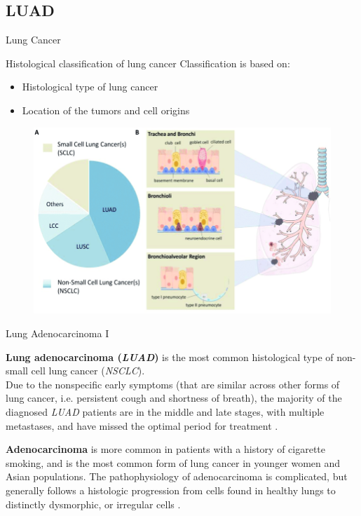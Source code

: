 \documentclass{beamer}
\begin{document}
\subsection{LUAD}
\begin{frame}{Lung Cancer}
  \begin{block}{Histological classification of lung cancer \cite{lungimage}}
    Classification is based on:
    \begin{itemize}
      \item Histological type of lung cancer
      \item Location of the tumors and cell origins
    \end{itemize}       
  \end{block}
  \pause
  \begin{figure}
    \centering
    \includegraphics[scale = 0.21]{img/Histological_Lung_Cancer.png}
  \end{figure}
\end{frame}
\begin{frame}{Lung Adenocarcinoma I}
  \begin{block}{}
    \textbf{Lung adenocarcinoma (\textit{LUAD})} is the most common histological
    type of non-small cell lung cancer (\textit{NSCLC}).\\ 
    Due to the nonspecific early symptoms (that are similar across other forms
    of lung cancer, i.e. persistent cough and shortness of breath), the majority
    of the diagnosed \textit{LUAD} patients are in the middle and late stages,
    with multiple metastases, and have missed the optimal period for treatment
    \cite{luadpot}.  
  \end{block}
  \pause
  \begin{block}{}
    \textbf{Adenocarcinoma} is more common in patients with a history of
    cigarette smoking, and is the most common form of lung cancer in younger
    women and Asian populations. The pathophysiology of adenocarcinoma is
    complicated, but generally follows a histologic progression from cells found
    in healthy lungs to distinctly dysmorphic, or irregular cells
    \cite{luadwiki}.  
  \end{block}
\end{frame}
\end{document}
